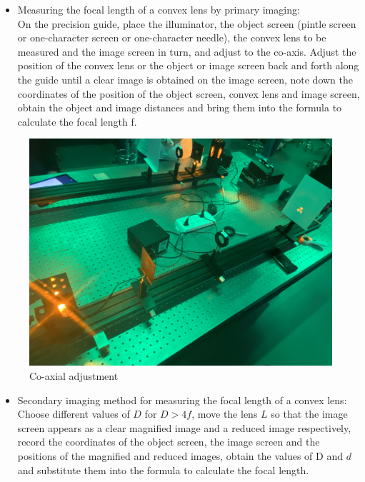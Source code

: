 \documentclass[UTF8]{article}
\begin{document}
    \begin{itemize}
    \item Measuring the focal length of a convex lens by primary imaging:\\
    On the precision guide, place the illuminator, the object screen (pintle screen or one-character screen or one-character needle), the convex lens to be measured and the image screen in turn, and adjust to the co-axis. Adjust the position of the convex lens or the object or image screen back and forth along the guide until a clear image is obtained on the image screen, note down the coordinates of the position of the object screen, convex lens and image screen, obtain the object and image distances and bring them into the formula to calculate the focal length f.
    \end{itemize}
     \begin{figure}[H]
            	     	\centering
            	     	\includegraphics[clip,scale=0.07,trim={0 400 0 600}]{fig/fig13.jpg}
            	     	\caption{Co-axial adjustment}
            	     	\label{figure.13}
         \end{figure}
         
     \begin{itemize}
         \item Secondary imaging method for measuring the focal length of a convex lens:\\
         Choose different values of $D$ for $D > 4f$, move the lens $L$ so that the image screen appears as a clear magnified image and a reduced image respectively, record the coordinates of the object screen, the image screen and the positions of the magnified and reduced images, obtain the values of D and $d$ and substitute them into the formula to calculate the focal length.
     \end{itemize}
   
\end{document}
